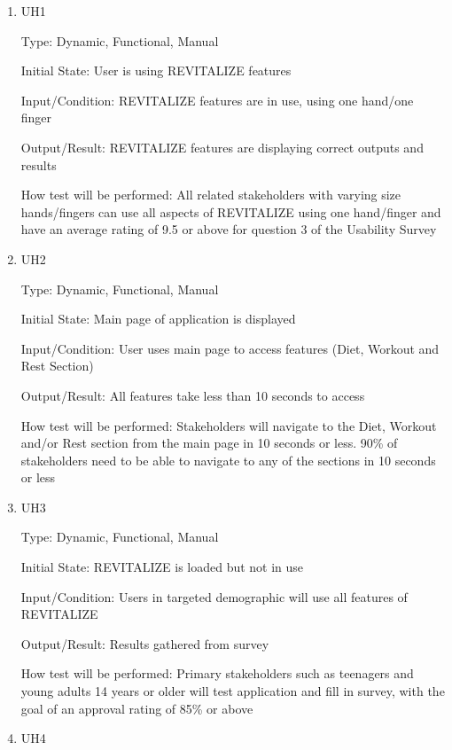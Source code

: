 \documentclass[12pt, titlepage]{article}
\begin{document}
\begin{enumerate}
	
	\item{UH1\\}
	
	Type: Dynamic, Functional, Manual
	
	Initial State: User is using REVITALIZE features
	
	Input/Condition: REVITALIZE features are in use, using one hand/one finger
	
	Output/Result: REVITALIZE features are displaying correct outputs and results
	
	How test will be performed: All related stakeholders with varying size hands/fingers can use all aspects of REVITALIZE using one hand/finger and have an average rating of 9.5 or above for question 3 of the Usability Survey
	
	\item{UH2\\}
	
	Type: Dynamic, Functional, Manual
	
	Initial State: Main page of application is displayed
	
	Input/Condition: User uses main page to access features (Diet, Workout and Rest Section)
	
	Output/Result: All features take less than 10 seconds to access
	
	How test will be performed: Stakeholders will navigate to the Diet, Workout and/or Rest section from the main page in 10 seconds or less. 90\% of stakeholders need to be able to navigate to any of the sections in 10 seconds or less
	
	\item{UH3\\}
	
	Type: Dynamic, Functional, Manual
	
	Initial State: REVITALIZE is loaded but not in use
	
	Input/Condition: Users in targeted demographic will use all features of REVITALIZE
	
	Output/Result: Results gathered from survey
	
	How test will be performed: Primary stakeholders such as teenagers and young adults 14 years or older will test application and fill in survey, with the goal of an approval rating of 85\% or above
	
	\item{UH4\\}
	

\end{enumerate}
\end{document}
